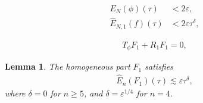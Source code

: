 \documentclass[10pt,a4paper]{amsart}
\newtheorem{lemma}{Lemma}
\begin{document}
\begin{align}
E_N ( \phi ) ( \tau ) & < 2 \varepsilon , \label{bootsphi} \\
\hat{ E }_{ N , 1 } ( f ) ( \tau ) & < 2 \varepsilon \tau^\delta , \label{bootsf}
\end{align}

\begin{align} \label{TphiH}
T_\phi F_1 + R_1 F_1 = 0 ,
\end{align}

\begin{lemma} \label{lem homo}
The homogeneous part $ F_1 $ satisfies
\begin{align}
\hat{ E }_n ( F_1 ) ( \tau ) \lesssim \varepsilon \tau^\delta , \label{homo}
\end{align}
where $ \delta = 0 $ for $ n \geq 5 $, and $ \delta = \varepsilon^{ 1 / 4 } $ for $ n = 4 $.
\end{lemma}
\end{document}
